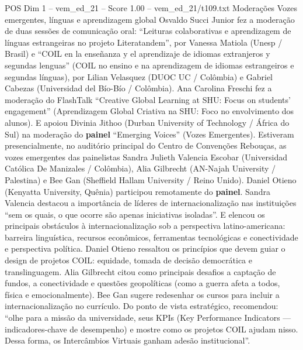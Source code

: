 \begin{textsample}{POS Dim 1 – vem\_ed\_21 – Score 1.00 – vem\_ed\_21/t109.txt}  \label{ex:f1_pos_040}
Moderações Vozes emergentes, línguas e aprendizagem global Osvaldo Succi Junior fez a moderação de duas sessões de comunicação oral: “Leituras colaborativas e aprendizagem de línguas estrangeiras no projeto Literatandem”, por Vanessa Matiola (Unesp / Brasil) e “COIL en la enseñanza y el aprendizaje de idiomas extranjeros y segundas lenguas” (COIL no ensino e na aprendizagem de idiomas estrangeiros e segundas línguas), por Lilian Velasquez (DUOC UC / Colômbia) e Gabriel Cabezas (Universidad del Bío-Bío / Colômbia).
Ana Carolina Freschi fez a moderação do FlashTalk “Creative Global Learning at SHU: Focus on students’ engagement” (Aprendizagem Global Criativa na SHU: Foco no envolvimento dos alunos).
E apoiou Divinia Jithoo (Durban University of Technology / África do Sul) na moderação do \textbf{painel} “Emerging Voices” (Vozes Emergentes).
Estiveram presencialmente, no auditório principal do Centro de Convenções Rebouças, as vozes emergentes das painelistas Sandra Julieth Valencia Escobar (Universidad Católica De Manizales / Colômbia), Alia Gilbrecht (AN-Najah University / Palestina) e Bee Gan (Sheffield Hallam University / Reino Unido).
Daniel Otieno (Kenyatta University, Quênia) participou remotamente do \textbf{painel}.
Sandra Valencia destacou a importância de líderes de internacionalização nas instituições “sem os quais, o que ocorre são apenas iniciativas isoladas”.
E elencou os principais obstáculos à internacionalização sob a perspectiva latino-americana: barreira linguística, recursos econômicos, ferramentas tecnológicas e conectividade e perspectiva política.
Daniel Otieno ressaltou os princípios que devem guiar o design de projetos COIL: equidade, tomada de decisão democrática e translinguagem.
Alia Gilbrecht citou como principais desafios a captação de fundos, a conectividade e questões geopolíticas (como a guerra afeta a todos, física e emocionalmente).
Bee Gan sugere redesenhar os cursos para incluir a internacionalização no currículo.
Do ponto de vista estratégico, recomendou: “olhe para a missão da universidade, seus KPIs (Key Performance Indicators — indicadores-chave de desempenho) e mostre como os projetos COIL ajudam nisso.
Dessa forma, os Intercâmbios Virtuais ganham adesão institucional”.

\end{textsample}
